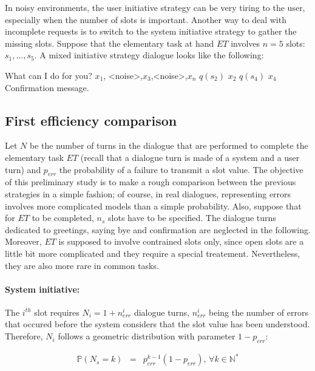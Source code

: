 		In noisy environments, the user initiative strategy can be very tiring to the user, especially when the number of slots is important. Another way to deal with incomplete requests is to switch to the system initiative strategy to gather the missing slots. Suppose that the elementary task at hand $ET$ involves $n=5$ slots: $s_1,...,s_5$. A mixed initiative strategy dialogue looks like the following:
		
		\begin{dialogue}
			 What can I do for you?
			 $x_1$, <noise>,$x_3$,<noise>,$x_n$
			 $q(s_2)$
			 $x_2$
			 $q(s_4)$
			 $x_4$
			 Confirmation message.
		\end{dialogue}
	
	\subsection{First efficiency comparison}
	
		Let $N$ be the number of turns in the dialogue that are performed to complete the elementary task $ET$ (recall that a dialogue turn is made of a system and a user turn) and $p_{err}$ the probability of a failure to transmit a slot value. The objective of this preliminary study is to make a rough comparison between the previous strategies in a simple fashion; of course, in real dialogues, representing errors involves more complicated models than a simple probability. Also, suppose that for $ET$ to be completed, $n_s$ slots have to be specified. The dialogue turns dedicated to greetings, saying bye and confirmation are neglected in the following. Moreover, $ET$ is supposed to involve contrained slots only, since open slots are a little bit more complicated and they require a special treatement. Nevertheless, they are also more rare in common tasks.

                \paragraph{System initiative:} The $i^{th}$ slot requires $N_i = 1 + n^i_{err}$ dialogue turns, $n^i_{err}$ being the number of errors that occured before the system considers that the slot value has been understood. Therefore, $N_i$ follows a geometric distribution with parameter $1-p_{err}$:

                     \begin{eqnarray}
                       \mathbb{P} (N_s = k) & = & p_{err}^{k-1} (1-p_{err}) \text{,  } \forall k \in \mathbb{N}^*
                     \end{eqnarray}

